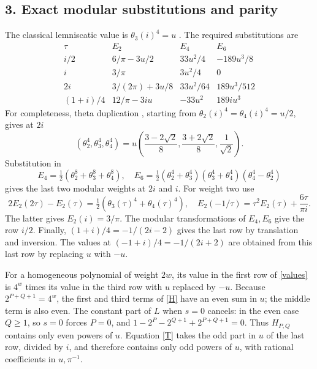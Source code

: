 \documentclass[11pt]{article}
\begin{document}
\subsection*{3. Exact modular substitutions and parity}
The classical lemniscatic value is $\theta_3(i)^4=u$
\cite[equation (2.3)]{XZ}. The required substitutions are
\begin{equation}\label{values}
\begin{array}{c|ccc}
 \tau&E_2&E_4&E_6\\\hline
 i/2&6/\pi-3u/2&33u^2/4&-189u^3/8\\
 i&3/\pi&3u^2/4&0\\
 2i&3/(2\pi)+3u/8&33u^2/64&189u^3/512\\
 (1+i)/4&12/\pi-3iu&-33u^2&189iu^3
\end{array}
\end{equation}
For completeness, theta duplication \cite{DLMF}, starting from
$\theta_2(i)^4=\theta_4(i)^4=u/2$, gives at $2i$
\[
 (\theta_2^4,\theta_3^4,\theta_4^4)
 =u\left(\frac{3-2\sqrt2}{8},\frac{3+2\sqrt2}{8},
          \frac1{\sqrt2}\right).
\]
Substitution in
\[
 E_4=\tfrac12(\theta_2^8+\theta_3^8+\theta_4^8),\quad
 E_6=\tfrac12(\theta_2^4+\theta_3^4)
              (\theta_3^4+\theta_4^4)(\theta_4^4-\theta_2^4)
\]
gives the last two modular weights at $2i$ and $i$. For weight two use
\[
 2E_2(2\tau)-E_2(\tau)=\tfrac12(\theta_3(\tau)^4+
                                      \theta_4(\tau)^4),\quad
 E_2(-1/\tau)=\tau^2E_2(\tau)+\frac{6\tau}{\pi i}.
\]
The latter gives $E_2(i)=3/\pi$. The modular transformations of
$E_4,E_6$ give the row $i/2$. Finally,
$(1+i)/4=-1/(2i-2)$ gives the last row by translation and inversion.
The values at $(-1+i)/4=-1/(2i+2)$ are obtained from this last row
by replacing $u$ with $-u$.

For a homogeneous polynomial of weight $2w$, its value in the first
row of \eqref{values} is $4^w$ times its value in the third row
with $u$ replaced by $-u$. Because $2^{P+Q+1}=4^w$, the first
and third terms of \eqref{H} have an even sum in $u$; the middle
term is also even. The constant part of $L$ when $s=0$ cancels:
in the even case $Q\ge1$, so $s=0$ forces $P=0$, and
$1-2^P-2^{Q+1}+2^{P+Q+1}=0$.
Thus $H_{P,Q}$ contains only even powers of $u$.
Equation \eqref{T} takes the odd part in $u$ of the last row,
divided by $i$, and therefore contains only odd powers of $u$,
with rational coefficients in $u,\pi^{-1}$.
\end{document}
